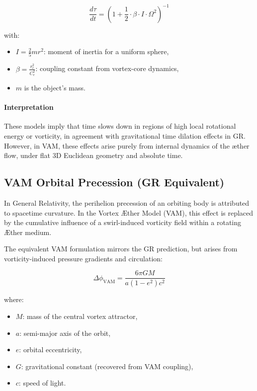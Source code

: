 \begin{equation}
    \frac{d\tau}{dt} =
    \left(1 + \frac{1}{2} \cdot \beta \cdot I \cdot \Omega^2 \right)^{-1}
\end{equation}

with:
\begin{itemize}
    \item \( I = \frac{2}{5} m r^2 \): moment of inertia for a uniform sphere,
    \item \( \beta = \frac{r_c^2}{C_e^2} \): coupling constant from vortex-core dynamics,
    \item \( m \) is the object's mass.
\end{itemize}

\paragraph{Interpretation}

These models imply that time slows down in regions of high local rotational energy or vorticity, in agreement with gravitational time dilation effects in GR. However, in VAM, these effects arise purely from internal dynamics of the æther flow, under flat 3D Euclidean geometry and absolute time.

\subsection*{VAM Orbital Precession (GR Equivalent)}

In General Relativity, the perihelion precession of an orbiting body is attributed to spacetime curvature. In the Vortex Æther Model (VAM), this effect is replaced by the cumulative influence of a swirl-induced vorticity field within a rotating Æther medium.

The equivalent VAM formulation mirrors the GR prediction, but arises from vorticity-induced pressure gradients and circulation:

\begin{equation}
    \Delta\phi_{\text{VAM}} =
    \frac{6\pi G M}{a(1 - e^2) c^2}
\end{equation}

where:
\begin{itemize}
    \item \( M \): mass of the central vortex attractor,
    \item \( a \): semi-major axis of the orbit,
    \item \( e \): orbital eccentricity,
    \item \( G \): gravitational constant (recovered from VAM coupling),
    \item \( c \): speed of light.
\end{itemize}

